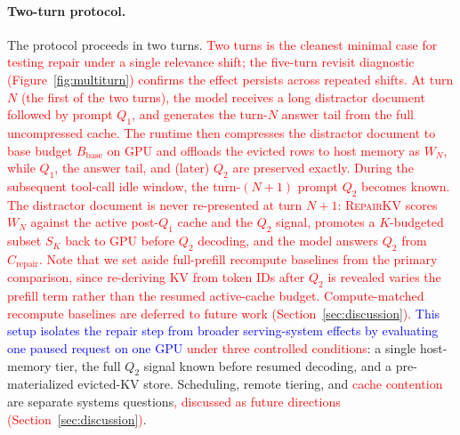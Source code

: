 \documentclass{article}
\newcommand{\repairkv}{\textsc{RepairKV}}
\newcommand{\bbase}{\ensuremath{B_{\mathrm{base}}}}
\begin{document}
\paragraph{Two-turn protocol.}
The protocol proceeds in two turns. 
\textcolor{red}{Two turns is the cleanest minimal case for testing
repair under a single relevance shift; the five-turn revisit
diagnostic (Figure~\ref{fig:multiturn}) confirms the effect persists
across repeated shifts.}
\textcolor{red}{At turn $N$ (the first of the two turns), the model
receives a long distractor document followed by prompt $Q_1$, and
generates the turn-$N$ answer tail from the full uncompressed cache.
The runtime then compresses the distractor document to base budget
$\bbase$ on GPU and offloads the evicted rows to host memory as
$W_N$, while $Q_1$, the answer tail, and (later) $Q_2$ are preserved
exactly. During the subsequent tool-call idle window, the
turn-$(N{+}1)$ prompt $Q_2$ becomes known. The distractor document
is never re-presented at turn $N{+}1$: \repairkv{} scores $W_N$
against the active post-$Q_1$ cache and the $Q_2$ signal, promotes a
$K$-budgeted subset $S_K$ back to GPU before $Q_2$ decoding, and the
model answers $Q_2$ from $C_{\mathrm{repair}}$.}
\textcolor{red}{Note that we set aside full-prefill recompute baselines
from the primary comparison, since re-deriving KV from token IDs after
$Q_2$ is revealed varies the prefill term rather than the resumed
active-cache budget. Compute-matched recompute baselines are deferred to
future work (Section~\ref{sec:discussion}).}
\textcolor{blue}{This setup isolates the repair step from broader serving-system effects by
evaluating one paused request on one GPU} \textcolor{red}{under three controlled conditions}:
a single host-memory tier, the full $Q_2$ signal known before resumed
decoding, and a pre-materialized evicted-KV store.
Scheduling, remote tiering, and \textcolor{red}{cache contention} are separate systems
questions\textcolor{red}{, discussed as future directions
(Section~\ref{sec:discussion})}.
\end{document}
